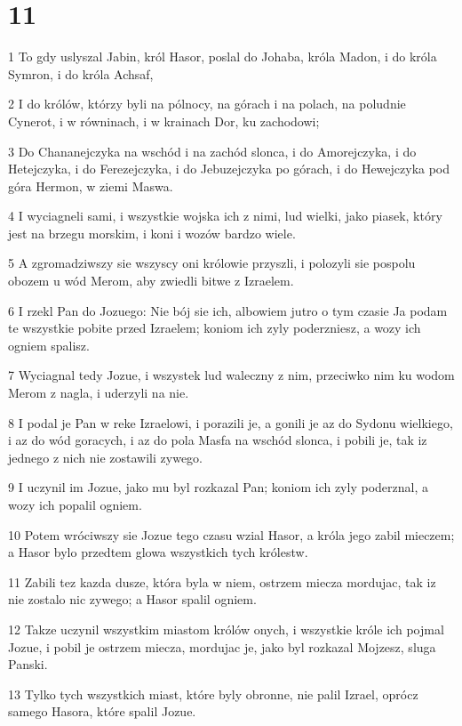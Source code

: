 \chapter{11}

\par 1 To gdy uslyszal Jabin, król Hasor, poslal do Johaba, króla Madon, i do króla Symron, i do króla Achsaf,
\par 2 I do królów, którzy byli na pólnocy, na górach i na polach, na poludnie Cynerot, i w równinach, i w krainach Dor, ku zachodowi;
\par 3 Do Chananejczyka na wschód i na zachód slonca, i do Amorejczyka, i do Hetejczyka, i do Ferezejczyka, i do Jebuzejczyka po górach, i do Hewejczyka pod góra Hermon, w ziemi Maswa.
\par 4 I wyciagneli sami, i wszystkie wojska ich z nimi, lud wielki, jako piasek, który jest na brzegu morskim, i koni i wozów bardzo wiele.
\par 5 A zgromadziwszy sie wszyscy oni królowie przyszli, i polozyli sie pospolu obozem u wód Merom, aby zwiedli bitwe z Izraelem.
\par 6 I rzekl Pan do Jozuego: Nie bój sie ich, albowiem jutro o tym czasie Ja podam te wszystkie pobite przed Izraelem; koniom ich zyly poderzniesz, a wozy ich ogniem spalisz.
\par 7 Wyciagnal tedy Jozue, i wszystek lud waleczny z nim, przeciwko nim ku wodom Merom z nagla, i uderzyli na nie.
\par 8 I podal je Pan w reke Izraelowi, i porazili je, a gonili je az do Sydonu wielkiego, i az do wód goracych, i az do pola Masfa na wschód slonca, i pobili je, tak iz jednego z nich nie zostawili zywego.
\par 9 I uczynil im Jozue, jako mu byl rozkazal Pan; koniom ich zyly poderznal, a wozy ich popalil ogniem.
\par 10 Potem wróciwszy sie Jozue tego czasu wzial Hasor, a króla jego zabil mieczem; a Hasor bylo przedtem glowa wszystkich tych królestw.
\par 11 Zabili tez kazda dusze, która byla w niem, ostrzem miecza mordujac, tak iz nie zostalo nic zywego; a Hasor spalil ogniem.
\par 12 Takze uczynil wszystkim miastom królów onych, i wszystkie króle ich pojmal Jozue, i pobil je ostrzem miecza, mordujac je, jako byl rozkazal Mojzesz, sluga Panski.
\par 13 Tylko tych wszystkich miast, które byly obronne, nie palil Izrael, oprócz samego Hasora, które spalil Jozue.
